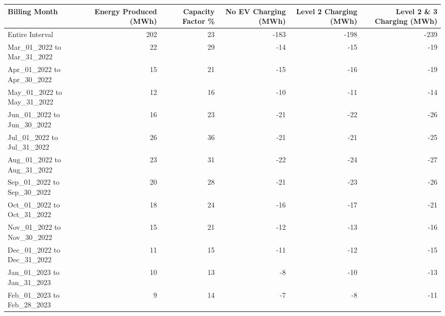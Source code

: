 \begin{tabular}{lrrrrr}
\toprule
\scriptsize Billing Month &  \scriptsize Energy Produced  (MWh) &  \scriptsize Capacity Factor \%  &  \scriptsize No EV Charging (MWh) & \scriptsize Level  2 Charging  (MWh) & \scriptsize  Level 2 \& 3 Charging  (MWh) \\
\midrule
\normalsize
Entire Interval &                 202 &                 23  &        -183 &        -198 &        -239  \\
Mar\_01\_2022 to Mar\_31\_2022 &                  22 &                 29 &         -14 &         -15 &         -19  \\ 
Apr\_01\_2022 to Apr\_30\_2022 &                  15 &                 21  &         -15 &         -16 &         -19 \\
May\_01\_2022 to May\_31\_2022 &                  12 &                 16 &         -10 &         -11 &         -14 \\
Jun\_01\_2022 to Jun\_30\_2022 &                  16 &                 23 &         -21 &         -22 &         -26  \\
Jul\_01\_2022 to Jul\_31\_2022 &                  26 &                 36   &         -21 &         -21 &         -25 \\
Aug\_01\_2022 to Aug\_31\_2022 &                  23 &                 31  &         -22 &         -24 &         -27 \\
Sep\_01\_2022 to Sep\_30\_2022 &                  20 &                 28 &         -21 &         -23 &         -26 \\
Oct\_01\_2022 to Oct\_31\_2022 &                  18 &                 24  &         -16 &         -17 &         -21 \\
Nov\_01\_2022 to Nov\_30\_2022 &                  15 &                 21 &         -12 &         -13 &         -16  \\
Dec\_01\_2022 to Dec\_31\_2022 &                  11 &                 15  &         -11 &         -12 &         -15  \\
Jan\_01\_2023 to Jan\_31\_2023 &                  10 &                 13  &          -8 &         -10 &         -13   \\
Feb\_01\_2023 to Feb\_28\_2023 &                   9 &                 14  &          -7 &          -8 &         -11\\
\bottomrule
\end{tabular}
